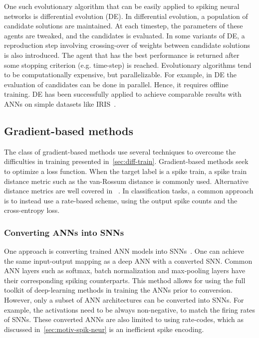 \documentclass[fyp]{socreport}
\begin{document}
One such evolutionary algorithm that can be easily applied to spiking neural
networks is differential evolution (DE). In differential evolution, a population
of candidate solutions are maintained. At each timestep, the parameters of these
agents are tweaked, and the candidates is evaluated. In some variants of DE, a
reproduction step involving crossing-over of weights between candidate solutions
is also introduced. The agent that has the best performance is returned after
some stopping criterion (e.g. time-step) is reached. Evolutionary algorithms
tend to be computationally expensive, but parallelizable. For example, in DE the
evaluation of candidates can be done in parallel. Hence, it requires offline
training. DE has been successfully applied to achieve comparable results with
ANNs on simple datasets like IRIS~\cite{pavlidisil_spikin}.

\subsection{Gradient-based methods}

The class of gradient-based methods use several techniques to overcome the
difficulties in training presented in~\autoref{sec:diff-train}. Gradient-based
methods seek to optimize a loss function. When the target label is a spike
train, a spike train distance metric such as the van-Rossum distance is commonly
used. Alternative distance metrics are well covered in
~\cite{victor05_spike_train_metric}. In classification tasks, a common approach
is to instead use a rate-based scheme, using the output spike counts and the
cross-entropy loss.

\subsubsection{Converting ANNs into SNNs}

One approach is converting trained ANN models into
SNNs~\cite{rueckauer16_theor_tools_conver_analog_to,zambrano16_fast_effic_async_neural_comput}.
One can achieve the same input-output mapping as a deep ANN with a converted
SNN. Common ANN layers such as softmax, batch normalization and max-pooling
layers have their corresponding spiking counterparts. This method allows for
using the full toolkit of deep-learning methods in training the ANNs prior to
conversion. However, only a subset of ANN architectures can be converted into
SNNs. For example, the activations need to be always non-negative, to match the
firing rates of SNNs. These converted ANNs are also limited to using rate-codes,
which as discussed in~\autoref{sec:motiv-spik-neur} is an inefficient spike
encoding.
\end{document}
